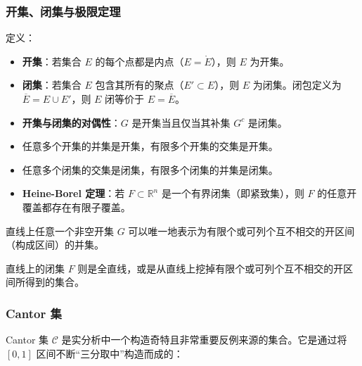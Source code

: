 \subsubsection{开集、闭集与极限定理}

\begin{definition}[开集与闭集]

定义：

\begin{itemize}
  \item {\textbf{开集}：若集合 $E$ 的每个点都是内点（$E = \mathring{E}$），则 $E$ 为开集。

}\item {\textbf{闭集}：若集合 $E$ 包含其所有的聚点（$E' \subset E$），则 $E$ 为闭集。闭包定义为 $\displaystyle \overline{E} = E \cup E'$，则 $E$ 闭等价于 $E = \overline{E}$。

}
\end{itemize}

\end{definition}

\begin{itemize}
  \item {\textbf{开集与闭集的对偶性}：$G$ 是开集当且仅当其补集 $G^c$ 是闭集。

}\item {任意多个开集的并集是开集，有限多个开集的交集是开集。

}\item {任意多个闭集的交集是闭集，有限多个闭集的并集是闭集。

}\item {\textbf{Heine-Borel 定理}：若 $F \subset \mathbb{R}^n$ 是一个有界闭集（即紧致集），则 $F$ 的任意开覆盖都存在有限子覆盖。

}
\end{itemize}

\begin{theorem}[直线上开集的结构定理]

直线上任意一个非空开集 $G$ 可以唯一地表示为有限个或可列个互不相交的开区间（构成区间）的并集。

\end{theorem}

直线上的闭集 $F$ 则是全直线，或是从直线上挖掉有限个或可列个互不相交的开区间所得到的集合。

\subsubsection{Cantor 集}

Cantor 集 $\mathcal{C}$ 是实分析中一个构造奇特且非常重要反例来源的集合。它是通过将 $[0,1]$ 区间不断“三分取中”构造而成的：

